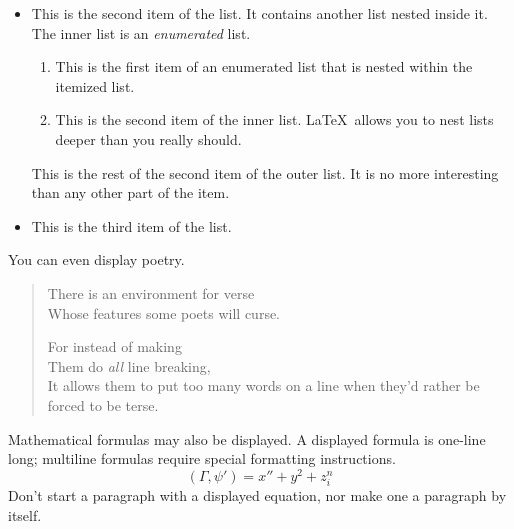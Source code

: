 \documentclass{article}      %
\newcommand{\ip}[2]{(#1, #2)}
\begin{document}
\begin{CJK}{UTF8}{gkai}
\begin{itemize}
   \item This is the second item of the list.  It
         contains another list nested inside it.  The inner
         list is an \emph{enumerated} list.
         \begin{enumerate}
            \item This is the first item of an enumerated 
                  list that is nested within the itemized list.

            \item This is the second item of the inner list.  
                  \LaTeX\ allows you to nest lists deeper than 
                  you really should.
         \end{enumerate}
         This is the rest of the second item of the outer
         list.  It is no more interesting than any other
         part of the item.
   \item This is the third item of the list.
\end{itemize}
You can even display poetry.
\begin{verse}
   There is an environment 
    for verse \\             %
   Whose features some poets %
   will curse.   


   For instead of making\\
   Them do \emph{all} line breaking, \\
   It allows them to put too many words on a line when they'd rather be 
   forced to be terse.
\end{verse}

Mathematical formulas may also be displayed.  A
displayed formula 
is 
one-line long; multiline
formulas require special formatting instructions.
   \[  \ip{\Gamma}{\psi'} = x'' + y^{2} + z_{i}^{n}\]
Don't start a paragraph with a displayed equation,
nor make one a paragraph by itself.

\end{CJK}
\end{document}
